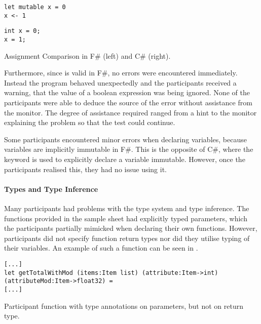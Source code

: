 \begin{listing}[H]
\begin{minipage}{.45\textwidth}
\begin{verbatim}
let mutable x = 0
x <- 1
\end{verbatim}
\end{minipage}
\hfill
\begin{minipage}{.45\textwidth}
\begin{verbatim}
int x = 0;
x = 1;
\end{verbatim}
\end{minipage}
\caption{Assignment Comparison in F\# (left) and C\# (right).}
\label{lst:ass-comp}
\end{listing}

Furthermore, since  is valid in F\#, no errors were encountered immediately. Instead the program behaved unexpectedly and the participants received a warning, that the value of a boolean expression was being ignored. None of the participants were able to deduce the source of the error without assistance from the monitor. The degree of assistance required ranged from a hint to the monitor explaining the problem so that the test could continue.

Some participants encountered minor errors when declaring variables, because variables are implicitly immutable in F\#. This is the opposite of C\#, where the  keyword is used to explicitly declare a variable immutable. However, once the participants realised this, they had no issue using it.

\paragraph{Types and Type Inference}
Many participants had problems with the type system and type inference. The functions provided in the sample sheet had explicitly typed parameters, which the participants partially mimicked when declaring their own functions. However, participants did not specify function return types nor did they utilise typing of their variables. An example of such a function can be seen in .

\begin{listing}[H]
\begin{verbatim}
[...]
let getTotalWithMod (items:Item list) (attribute:Item->int) (attributeMod:Item->float32) =
[...]
\end{verbatim}
\caption{Participant function with type annotations on parameters, but not on return type.}
\label{lst:part-func}
\end{listing}


